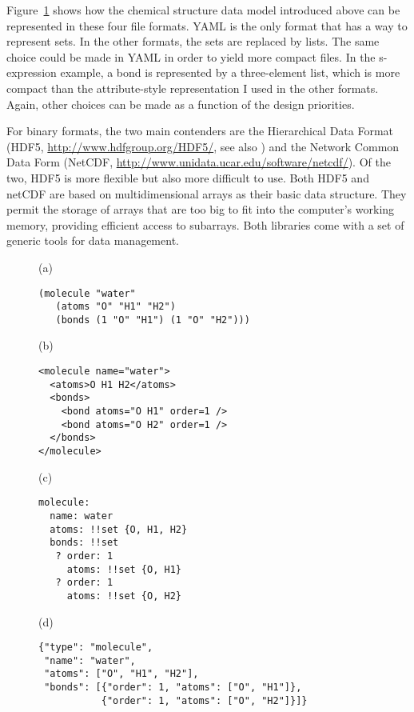 \documentclass{csmagazine}
\begin{document}
Figure~\ref{fig:file-formats} shows how the chemical structure data model introduced above can be represented in these four file formats. YAML is the only format that has a way to represent sets. In the other formats, the sets are replaced by lists. The same choice could be made in YAML in order to yield more compact files. In the s-expression example, a bond is represented by a three-element list, which is more compact than the attribute-style representation I used in the other formats. Again, other choices can be made as a function of the design priorities.

For binary formats, the two main contenders are the Hierarchical Data Format (HDF5, \url{http://www.hdfgroup.org/HDF5/}, see also \cite{HDF5}) and the Network Common Data Form (NetCDF, \url{http://www.unidata.ucar.edu/software/netcdf/}). Of the two, HDF5 is more flexible but also more difficult to use. Both HDF5 and netCDF are based on multidimensional arrays as their basic data structure. They permit the storage of arrays that are too big to fit into the computer's working memory, providing efficient access to subarrays. Both libraries come with a set of generic tools for data management.

\begin{figure}[h!]
\begin{center}	
(a)
\begin{verbatim}
(molecule "water"
   (atoms "O" "H1" "H2")
   (bonds (1 "O" "H1") (1 "O" "H2")))
\end{verbatim}

(b)
\begin{verbatim}
<molecule name="water">
  <atoms>O H1 H2</atoms>
  <bonds>
    <bond atoms="O H1" order=1 />
    <bond atoms="O H2" order=1 />
  </bonds>
</molecule>
\end{verbatim}

(c)
\begin{verbatim}
molecule:
  name: water
  atoms: !!set {O, H1, H2}
  bonds: !!set
   ? order: 1
     atoms: !!set {O, H1}
   ? order: 1
     atoms: !!set {O, H2}
\end{verbatim}

(d)
\begin{verbatim}
{"type": "molecule",
 "name": "water",
 "atoms": ["O", "H1", "H2"],
 "bonds": [{"order": 1, "atoms": ["O", "H1"]},
           {"order": 1, "atoms": ["O", "H2"]}]}
\end{verbatim}

\label{fig:file-formats}

\end{center}

\end{figure}
\end{document}
